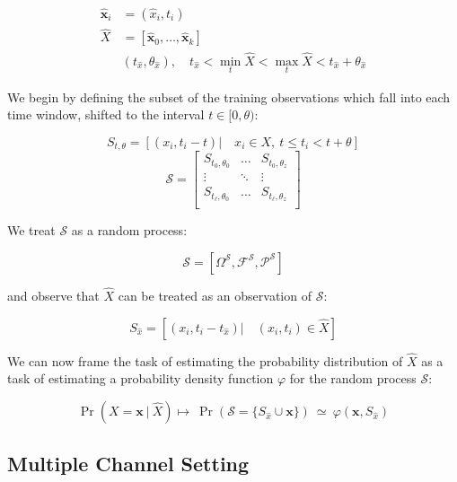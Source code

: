\documentclass[10pt]{article}
\begin{document}
\begin{align*}
\mathbf{\hat{x}}_i &= (\hat{x}_i,t_i) \\
\hat{X} &= [ \mathbf{\hat{x}}_0,\hdots,\mathbf{\hat{x}}_k ] \\
&(t_{\hat{x}}, \theta_{\hat{x}} ), \quad t_{\hat{x}} < \min_t \hat{X} < \max_t \hat{X} < t_{\hat{x}} + \theta_{\hat{x}}
\end{align*}

We begin by defining the subset of the training observations which fall into each time window, shifted to the interval \( t \in [0,\theta) \):

\begin{equation} \label{eq:Ssingle} S_{t,\theta} = \left[ \left( x_i,t_i - t \right) | \quad x_i \in X, \ t \le t_i < t+\theta \right] \end{equation}
\[ \mathcal{S} = 
\begin{bmatrix} 
S_{t_0,\theta_0} & \hdots & S_{t_0,\theta_z} \\
\vdots & \ddots & \vdots \\
S_{t_\ell, \theta_0} & \hdots & S_{t_\ell, \theta_z} \\
\end{bmatrix}  
\]

We treat \( \mathcal{S} \) as a random process:

\[ \mathcal{S} = [ \Omega^\mathcal{S}, \mathcal{F}^\mathcal{S},\mathcal{P}^\mathcal{S}] \]

 and observe that \( \hat{X} \) can be treated as an observation of \( \mathcal{S} \):

\begin{equation} \label{eq:SySingle} 
S_{\hat{x}} =  \left[ \left( x_i,t_i - t_{\hat{x}} \right) | \quad (x_i,t_i) \in \hat{X} \right] 
\end{equation}

We can now frame the task of estimating the probability distribution of \( \hat{X} \) as a task of estimating a probability density function \( \varphi \) for the random process \( \mathcal{S} \): 

\begin{equation} \label{eq:PrS}
\Pr( X = \mathbf{x} \ | \ \hat{X} ) \mapsto \ \Pr( \mathcal{S} = \{ S_{\hat{x}} \cup \mathbf{x} \} ) \ \simeq \ \varphi( \mathbf{x}, S_{\hat{x}} )
\end{equation}


\subsection{Multiple Channel Setting}
\end{document}
